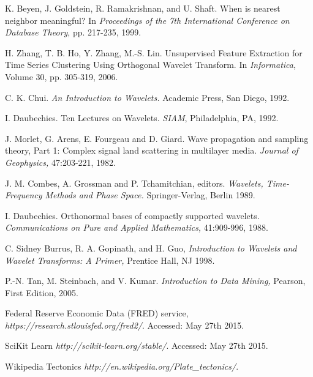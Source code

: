 \documentclass{article}
\begin{document}
\begin{thebibliography}{1}

 K. Beyen, J. Goldstein, R. Ramakrishnan, and U. Shaft. When is nearest neighbor meaningful? In {\em Proceedings of the 7th International Conference on Database Theory}, pp. 217-235, 1999.

 H. Zhang, T. B. Ho, Y. Zhang, M.-S. Lin. Unsupervised Feature Extraction for Time Series Clustering Using Orthogonal Wavelet Transform. In {\em Informatica}, Volume 30, pp. 305-319, 2006.

 C. K. Chui. {\em An Introduction to Wavelets.} Academic Press, San Diego, 1992.

 I. Daubechies. Ten Lectures on Wavelets. {\em SIAM}, Philadelphia, PA, 1992.

 J. Morlet, G. Arens, E. Fourgeau and D. Giard. Wave propagation and sampling theory, Part 1: Complex  signal land scattering in multilayer media. {\em Journal of Geophysics,} 47:203-221, 1982.

 J. M. Combes, A. Grossman and P. Tchamitchian, editors. {\em Wavelets, Time-Frequency Methods and Phase Space.} Springer-Verlag, Berlin 1989.

 I. Daubechies. Orthonormal bases of compactly supported wavelets. {\em Communications on Pure and Applied Mathematics,} 41:909-996, 1988.

 C. Sidney Burrus, R. A. Gopinath, and H. Guo, {\em Introduction to Wavelets and Wavelet Transforms: A Primer,} Prentice Hall, NJ 1998.

 P.-N. Tan, M. Steinbach, and V. Kumar. {\em Introduction to Data Mining,} Pearson, First Edition, 2005.

 Federal Reserve Economic Data (FRED) service, {\em https://research.stlouisfed.org/fred2/}. Accessed: May 27th 2015.

 SciKit Learn {\em http://scikit-learn.org/stable/}. Accessed: May 27th 2015.

 Wikipedia Tectonics {\em http://en.wikipedia.org/Plate\_tectonics/}.

\end{thebibliography}
\end{document}
